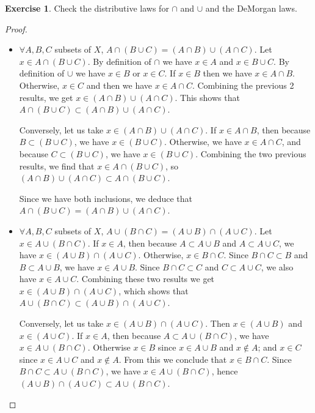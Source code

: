 \documentclass[11pt,a4paper,twoside]{article}
\theoremstyle{definition}
\newcounter{excounter}
\newtheorem{exercise}[excounter]{Exercise}
\begin{document}
\begin{exercise}
Check the distributive laws for $\cap$ and $\cup$ and the DeMorgan laws.
\end{exercise}

\begin{proof}\hfill
  \begin{itemize}
  \item $\forall A, B, C$ subsets of $X$, $A \cap (B \cup C) = (A \cap B) \cup (A \cap C)$.
    Let $x \in A \cap (B \cup C)$. By definition of $\cap$ we have $x \in A$ and $x \in B \cup C$.
    By definition of $\cup$ we have $x \in B$ or $x \in C$. If $x \in B$ then we have $x \in A \cap B$.
    Otherwise, $x \in C$ and then we have $x \in A \cap C$. Combining the previous 2 results, we get $x \in (A \cap B) \cup (A \cap C)$.
    This shows that $A \cap (B \cup C) \subset (A \cap B) \cup (A \cap C)$.

    Conversely, let us take $x \in (A \cap B) \cup (A \cap C)$. If $x \in A \cap B$, then because $B \subset (B \cup C)$, we have $x \in (B \cup C)$.
    Otherwise, we have $x \in A \cap C$, and because $C \subset (B \cup C)$, we have $x \in (B \cup C)$.
    Combining the two previous results, we find that $x \in A \cap (B \cup C)$, so $(A \cap B) \cup (A \cap C) \subset A \cap (B \cup C)$.

    Since we have both inclusions, we deduce that $A \cap (B \cup C) = (A \cap B) \cup (A \cap C)$.

  \item $\forall A, B, C$ subsets of $X$, $A \cup (B \cap C) = (A \cup B) \cap (A \cup C)$.
    Let $x \in A \cup (B \cap C)$. If $x \in A$, then because $A \subset A \cup B$ and $A \subset A \cup C$, we have $x \in (A \cup B) \cap (A \cup C)$.
    Otherwise, $x \in B \cap C$. Since $B \cap C \subset B$ and $B \subset A \cup B$, we have $x \in A \cup B$.
    Since $B \cap C \subset C$ and $C \subset A \cup C$, we also have $x \in A \cup C$.
    Combining these two results we get $x \in (A \cup B) \cap (A \cup C)$, which shows that $A \cup (B \cap C) \subset (A \cup B) \cap (A \cup C)$.

    Conversely, let us take $x \in (A \cup B) \cap (A \cup C)$. Then $x \in (A \cup B)$ and $x \in (A \cup C)$.
    If $x \in A$, then because $A \subset A \cup (B \cap C)$, we have $x \in A \cup (B \cap C)$.
    Otherwise $x \in B$ since $x \in A \cup B$ and $x \notin A$; and $x \in C$ since $x \in A \cup C$ and $x \notin A$.
    From this we conclude that $x \in B \cap C$. Since $B \cap C \subset A \cup (B \cap C)$, we have $x \in A \cup (B \cap C)$, hence $(A \cup B) \cap (A \cup C) \subset A \cup (B \cap C)$.


\end{itemize}
\end{proof}
\end{document}
